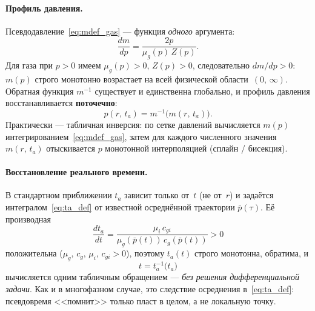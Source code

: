 ﻿\documentclass[12pt,a4paper]{article}
\begin{document}
\paragraph{Профиль давления.}
Псевдодавление~\eqref{eq:mdef_gas} --- функция
\emph{одного} аргумента:
\begin{equation}\label{eq:dmdp_gas}
  \frac{dm}{dp} = \frac{2p}{\mu_g(p)\,Z(p)}.
\end{equation}
Для газа при $p > 0$ имеем $\mu_g(p) > 0$, $Z(p) > 0$,
следовательно $dm/dp > 0$: $m(p)$ строго монотонно возрастает
на всей физической области~$(0,\,\infty)$. Обратная функция
$m^{-1}$ существует и единственна глобально, и профиль
давления восстанавливается \textbf{поточечно}:
\begin{equation}\label{eq:recover_p_gas}
  \boxed{\,p(r,\,t_a) = m^{-1}\bigl(m(r,\,t_a)\bigr).\,}
\end{equation}
Практически --- табличная инверсия: по сетке давлений
вычисляется $m(p)$ интегрированием~\eqref{eq:mdef_gas},
затем для каждого численного значения $m(r,\,t_a)$ отыскивается
$p$ монотонной интерполяцией (сплайн / бисекция).

\paragraph{Восстановление реального времени.}
В стандартном приближении $t_a$ зависит только от~$t$
(не от~$r$) и задаётся интегралом~\eqref{eq:ta_def} от
известной осреднённой траектории $\bar p(\tau)$.
Её производная
\begin{equation}\label{eq:dtadt_gas}
  \frac{dt_a}{dt} = \frac{\mu_i\,c_{gi}}
       {\mu_g(\bar p(t))\,c_g(\bar p(t))} > 0
\end{equation}
положительна ($\mu_g,\,c_g,\,\mu_i,\,c_{gi} > 0$), поэтому $t_a(t)$
строго монотонна, обратима, и
\begin{equation}\label{eq:recover_t_gas}
  t = t_a^{-1}\bigl(t_a\bigr)
\end{equation}
вычисляется одним табличным обращением --- \emph{без решения
дифференциальной задачи}. Как и в многофазном случае, это
следствие осреднения в~\eqref{eq:ta_def}: псевдовремя
<<помнит>> только пласт в целом, а не локальную точку.
\end{document}
